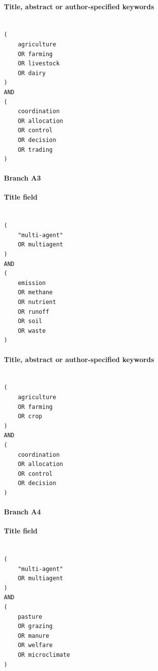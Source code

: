 \paragraph{Title, abstract or author-specified keywords}

\begin{lstlisting}

(
    agriculture
    OR farming
    OR livestock
    OR dairy
)
AND
(
    coordination
    OR allocation
    OR control
    OR decision
    OR trading
)

\end{lstlisting}

\paragraph{Branch A3}

\paragraph{Title field}

\begin{lstlisting}

(
    "multi-agent"
    OR multiagent
)
AND
(
    emission
    OR methane
    OR nutrient
    OR runoff
    OR soil
    OR waste
)

\end{lstlisting}

\paragraph{Title, abstract or author-specified keywords}

\begin{lstlisting}

(
    agriculture
    OR farming
    OR crop
)
AND
(
    coordination
    OR allocation
    OR control
    OR decision
)

\end{lstlisting}

\paragraph{Branch A4}

\paragraph{Title field}

\begin{lstlisting}

(
    "multi-agent"
    OR multiagent
)
AND
(
    pasture
    OR grazing
    OR manure
    OR welfare
    OR microclimate
)

\end{lstlisting}

